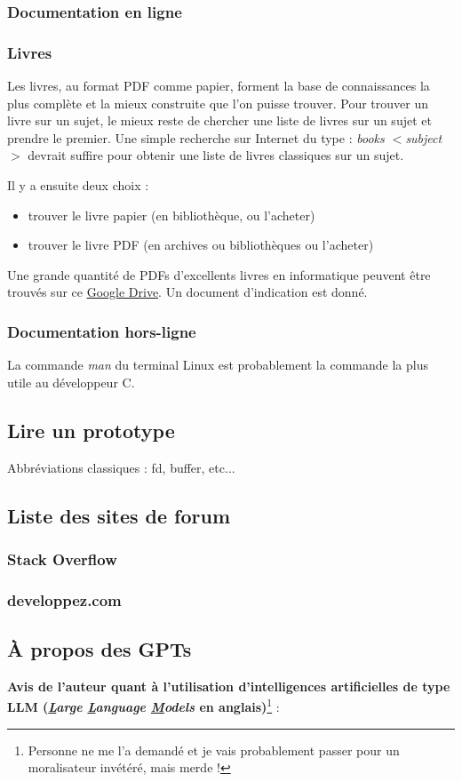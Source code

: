 \documentclass[../../../main.tex]{subfiles}
\begin{document}
\subsubsection{Documentation en ligne}
\subsubsection{Livres}
Les livres, au format PDF comme papier, forment la base de connaissances la plus complète et la mieux construite que l'on puisse trouver. Pour trouver un livre sur un sujet, le mieux reste de chercher une liste de livres sur un sujet et prendre le premier. Une simple recherche sur Internet du type : \textit{books $<$subject$>$} devrait suffire pour obtenir une liste de livres classiques sur un sujet.

Il y a ensuite deux choix :
\begin{itemize}
	\item trouver le livre papier (en bibliothèque, ou l'acheter)
	\item trouver le livre PDF (en archives ou bibliothèques ou l'acheter)
\end{itemize}
Une grande quantité de PDFs d'excellents livres en informatique peuvent être trouvés sur ce \href{https://drive.google.com/drive/u/1/folders/1fdPcRYRMhrEyqla_tYT2RyoFctbnXPn5}{Google Drive}. Un document d'indication est donné.
\subsubsection{Documentation hors-ligne}
La commande \textit{man} du terminal Linux est probablement la commande la plus utile au développeur C.
\subsection{Lire un prototype}
	Abbréviations classiques : fd, buffer, etc...
\subsection{Liste des sites de forum}
	\subsubsection{Stack Overflow}
	\subsubsection{developpez.com}
\subsection{À propos des GPTs}
\textbf{Avis de l'auteur quant à l'utilisation d'intelligences artificielles de type LLM (\textit{\underline{L}arge \underline{L}anguage \underline{M}odels} en anglais)}\footnote{Personne ne me l'a demandé et je vais probablement passer pour un moralisateur invétéré, mais merde !} :
 
\end{document}
